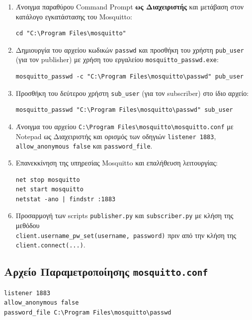 \documentclass[11pt, a4paper]{article}
\begin{document}
\begin{enumerate}
    \item Άνοιγμα παραθύρου Command Prompt \textbf{ως Διαχειριστής} και μετάβαση στον κατάλογο εγκατάστασης του Mosquitto:
\begin{lstlisting}[language={}]
cd "C:\Program Files\mosquitto"
\end{lstlisting}
    \item Δημιουργία του αρχείου κωδικών \texttt{passwd} και προσθήκη του χρήστη \texttt{pub\_user} (για τον publisher) με χρήση του εργαλείου \texttt{mosquitto\_passwd.exe}:
\begin{lstlisting}[language={}]
mosquitto_passwd -c "C:\Program Files\mosquitto\passwd" pub_user
\end{lstlisting}
    \item Προσθήκη του δεύτερου χρήστη \texttt{sub\_user} (για τον subscriber) στο ίδιο αρχείο:
\begin{lstlisting}[language={}]
mosquitto_passwd "C:\Program Files\mosquitto\passwd" sub_user
\end{lstlisting}
    \item Άνοιγμα του αρχείου \texttt{C:\textbackslash{}Program Files\textbackslash{}mosquitto\textbackslash{}mosquitto.conf} με Notepad ως Διαχειριστής και ορισμός των οδηγιών \texttt{listener 1883}, \texttt{allow\_anonymous false} και \texttt{password\_file}.
    \item Επανεκκίνηση της υπηρεσίας Mosquitto και επαλήθευση λειτουργίας:
\begin{lstlisting}[language={}]
net stop mosquitto
net start mosquitto
netstat -ano | findstr :1883
\end{lstlisting}
    \item Προσαρμογή των scripts \texttt{publisher.py} και \texttt{subscriber.py} με κλήση της μεθόδου \\ \texttt{client.username\_pw\_set(username, password)} πριν από την κλήση της \\ \texttt{client.connect(...)}.
\end{enumerate}

\subsection{Αρχείο Παραμετροποίησης \texttt{mosquitto.conf}}
\begin{lstlisting}[language={}]
listener 1883
allow_anonymous false
password_file C:\Program Files\mosquitto\passwd
\end{lstlisting}
\end{document}
